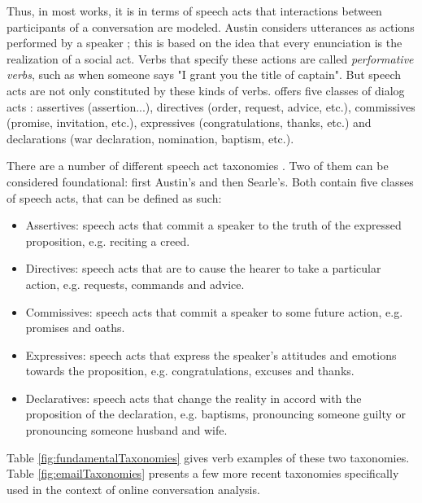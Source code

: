 \documentclass[11pt]{article}
\begin{document}
Thus, in most works, it is in terms of speech acts that interactions between participants of a conversation are modeled. Austin considers utterances as actions performed by a speaker ; this is based on the idea that every enunciation is the realization of a social act. Verbs that specify these actions are called \textit{performative verbs}, such as when someone says "I grant you the title of captain". But speech acts are not only constituted by these kinds of verbs. \cite{searle1976taxonomy} offers five classes of dialog acts : assertives (assertion...), directives (order, request, advice, etc.), commissives (promise, invitation, etc.), expressives (congratulations, thanks, etc.) and declarations (war declaration, nomination, baptism, etc.).

There are a number of different speech act taxonomies \cite{traum200020}. Two of them can be considered foundational: first Austin's and then Searle's. Both contain five classes of speech acts, that can be defined as such:


\begin{itemize}
	\item Assertives: speech acts that commit a speaker to the truth of the expressed proposition, e.g. reciting a creed.
	\item Directives: speech acts that are to cause the hearer to take a particular action, e.g. requests, commands and advice.
	\item Commissives: speech acts that commit a speaker to some future action, e.g. promises and oaths.
	\item Expressives: speech acts that express the speaker's attitudes and emotions towards the proposition, e.g. congratulations, excuses and thanks.
	\item Declaratives: speech acts that change the reality in accord with the proposition of the declaration, e.g. baptisms, pronouncing someone guilty or pronouncing someone husband and wife.
\end{itemize}

Table \ref{fig:fundamentalTaxonomies} gives verb examples of these two taxonomies. Table \ref{fig:emailTaxonomies} presents a few more recent taxonomies specifically used in the context of online conversation analysis.
\end{document}
